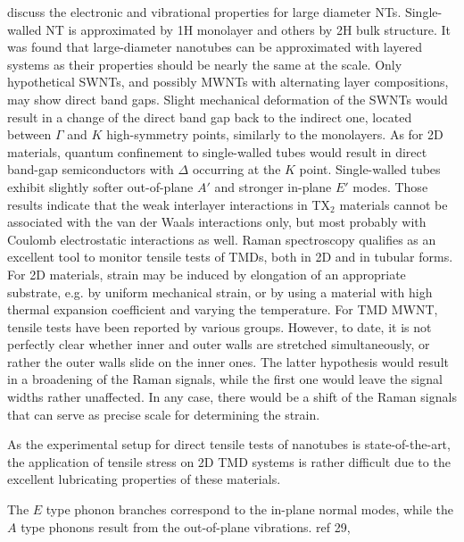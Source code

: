 \citeauthor{Ghorbani-asl} discuss the electronic and vibrational properties for large diameter  NTs\cite{Ghorbani-asl}. Single-walled NT is approximated by 1H monolayer and others by 2H bulk structure. It was found that large-diameter nanotubes can be approximated with layered systems as their properties should be nearly the same at the scale. Only hypothetical SWNTs, and possibly MWNTs with alternating layer compositions, may show direct band gaps. Slight mechanical deformation of the SWNTs would result in a change of the direct band gap back to the indirect one, located between $\Gamma$ and $K$ high-symmetry points, similarly to the monolayers. As for 2D materials, quantum confinement to single-walled tubes would result in direct band-gap semiconductors with $\Delta$ occurring at the $K$ point. Single-walled tubes exhibit slightly softer out-of-plane $A'$ and stronger in-plane $E'$ modes. Those results indicate that the weak interlayer interactions in TX$_2$ materials cannot be associated with the van der Waals interactions only, but most probably with Coulomb electrostatic interactions as well. Raman spectroscopy qualifies as an excellent tool to monitor tensile tests of TMDs, both in 2D and in tubular forms.
For 2D materials, strain may be induced by elongation of an appropriate substrate, e.g. by uniform mechanical strain, or by using a material with high thermal expansion coefficient and varying the temperature. For TMD MWNT, tensile tests have been reported by various groups. However, to date, it is not perfectly clear whether inner and outer walls are stretched simultaneously, or rather the outer walls slide on the inner ones. The latter hypothesis would result in a broadening of the Raman signals, while the first one would leave the signal widths rather unaffected. In any case, there would be a shift of the Raman signals that can serve as precise scale for determining the strain.

As the experimental setup for direct tensile tests of nanotubes is state-of-the-art,\cite{Tang2013} the application of tensile stress on 2D TMD systems is rather difficult due to the excellent lubricating properties of these materials.

The $E$ type phonon branches correspond to the in-plane normal modes, while the $A$ type phonons result from the out-of-plane vibrations. ref 29,

